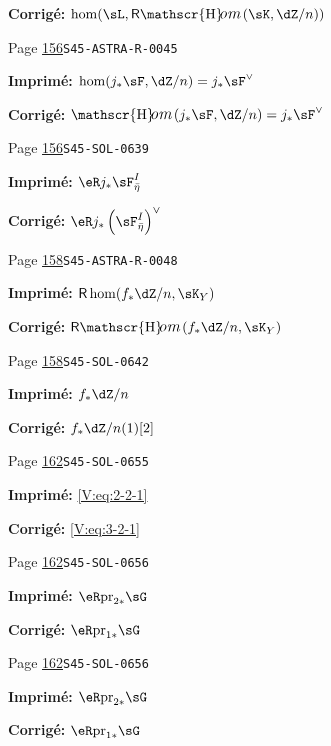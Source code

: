 \documentclass[oneside]{book}
\providecommand\calligra{\itshape}}
\DeclareMathOperator{\Hom}{\mathscr{H}\text{\kern -3pt {\calligra\large om}}\,} %
\DeclareMathOperator{\rHom}{\mathsf{R}\vspace{-1pt}\mathscr{H}\text{\kern -3pt {\calligra\large om}}\,}
\DeclareMathOperator{\rhom}{\mathsf{R}\hom}
\newcommand{\pr}{\mathrm{pr}} %
\theoremstyle{sga-source}
\theoremstyle{sga-source-dash}
\theoremstyle{sga-source-dotdash}
\theoremstyle{sga-source-number-note-dash}
\theoremstyle{sga-source-note-number-dotdash}
\theoremstyle{sga-source-example-dotdash}
\theoremstyle{sga-source-inline-number}
\theoremstyle{sga-source-bare-number}
\theoremstyle{sga-source}
\begin{document}
\begin{description}
\par\noindent\textbf{Corrigé:} \(\hom(\sL,\rHom(\sK,\dZ/n))\)
\smallskip
\item[\hypertarget{apparatus:FR-0126}{126}] Page \hyperlink{printpage:fr:156}{156}\quad\texttt{S45-ASTRA-R-0045}
\par\noindent\textbf{Imprimé:} \(\hom(j_\ast\sF,\dZ/n)=j_\ast\sF^\vee\)
\par\noindent\textbf{Corrigé:} \(\Hom(j_\ast\sF,\dZ/n)=j_\ast\sF^\vee\)
\smallskip
\item[\hypertarget{apparatus:FR-0127}{127}] Page \hyperlink{printpage:fr:156}{156}\quad\texttt{S45-SOL-0639}
\par\noindent\textbf{Imprimé:} \(\eR j_\ast \sF_{\bar\eta}^I\)
\par\noindent\textbf{Corrigé:} \(\eR j_\ast\left(\sF_{\bar\eta}^I\right)^\vee\)
\smallskip
\item[\hypertarget{apparatus:FR-0128}{128}] Page \hyperlink{printpage:fr:158}{158}\quad\texttt{S45-ASTRA-R-0048}
\par\noindent\textbf{Imprimé:} \(\rhom(f_\ast\dZ/n,\sK_Y)\)
\par\noindent\textbf{Corrigé:} \(\rHom(f_\ast\dZ/n,\sK_Y)\)
\smallskip
\item[\hypertarget{apparatus:FR-0129}{129}] Page \hyperlink{printpage:fr:158}{158}\quad\texttt{S45-SOL-0642}
\par\noindent\textbf{Imprimé:} \(f_\ast\dZ/n\)
\par\noindent\textbf{Corrigé:} \(f_\ast\dZ/n(1)[2]\)
\smallskip
\item[\hypertarget{apparatus:FR-0130}{130}] Page \hyperlink{printpage:fr:162}{162}\quad\texttt{S45-SOL-0655}
\par\noindent\textbf{Imprimé:} \eqref{V:eq:2-2-1}
\par\noindent\textbf{Corrigé:} \eqref{V:eq:3-2-1}
\smallskip
\item[\hypertarget{apparatus:FR-0131}{131}] Page \hyperlink{printpage:fr:162}{162}\quad\texttt{S45-SOL-0656}
\par\noindent\textbf{Imprimé:} \(\eR \pr_{2\ast}\sG\)
\par\noindent\textbf{Corrigé:} \(\eR \pr_{1\ast}\sG\)
\smallskip
\item[\hypertarget{apparatus:FR-0132}{132}] Page \hyperlink{printpage:fr:162}{162}\quad\texttt{S45-SOL-0656}
\par\noindent\textbf{Imprimé:} \(\eR \pr_{2\ast}\sG\)
\par\noindent\textbf{Corrigé:} \(\eR \pr_{1\ast}\sG\)

\end{description}
\end{document}
